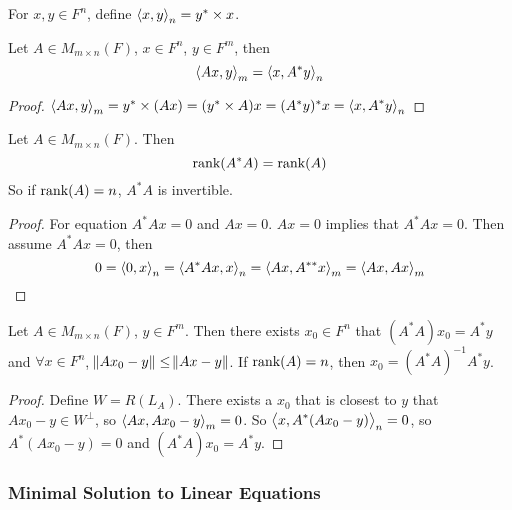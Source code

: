\begin{definition}
    For $x,y \in F^n$, define $\left\langle \displaystyle x, y \right\rangle_n = y^* \times x$.
\end{definition}


\begin{theorem}
    Let $A \in M_{m \times n} (F)$, $x \in F^n$, $y\in F^m$, then
    \begin{equation}
        \left\langle \displaystyle Ax, y \right\rangle_m = \left\langle \displaystyle x, A^* y \right\rangle_n
    \end{equation}
\end{theorem}
\begin{proof}
    $\left\langle \displaystyle Ax, y \right\rangle_m = y^* \times (Ax) = (y^* \times A) x = (A^* y)^* x = \left\langle \displaystyle x, A^* y \right\rangle_n$
\end{proof}

\begin{theorem}
    Let $A \in M_{m\times n} (F)$. Then
    \begin{equation}
        \displaystyle \text{rank}( A^*A ) = \displaystyle \text{rank}( A )
    \end{equation}
    So if $\displaystyle \text{rank}( A ) = n$, $A^*A$ is invertible.
\end{theorem}
\begin{proof}
    For equation $A^*Ax = 0$ and $Ax = 0$. $Ax=0$ implies that $A^*Ax =0$. Then assume $A^*Ax = 0$, then
    \begin{equation*}
        0 = \left\langle \displaystyle 0, x \right\rangle_n = \left\langle \displaystyle A^*Ax, x \right\rangle_n = \left\langle \displaystyle Ax, A^{**}x \right\rangle_m = \left\langle \displaystyle Ax, Ax \right\rangle_m
    \end{equation*}
\end{proof}


\begin{theorem}
    Let $A \in M_{m\times n} (F)$, $y \in F^m$. Then there exists $x_0 \in F^n$ that $(A^*A) x_0 = A^* y$ and $\forall x \in F^n$, $ \norm{Ax_0 - y} \leq \norm{Ax-y}$. If $\displaystyle \text{rank}( A ) = n$, then $x_0 = (A^*A)^{-1} A^* y$.
\end{theorem}
\begin{proof}
    Define $W=R(L_A)$. There exists a $x_0$ that is closest to $y$ that $Ax_0 - y \in W^\bot$, so $\left\langle \displaystyle Ax, Ax_0 - y \right\rangle_m = 0$. So $\left\langle \displaystyle x, A^*(Ax_0 - y) \right\rangle_n = 0$, so $A^*(Ax_0 - y) = 0$ and $(A^*A) x_0 = A^* y$. 
\end{proof}

\subsubsection{Minimal Solution to Linear Equations}

